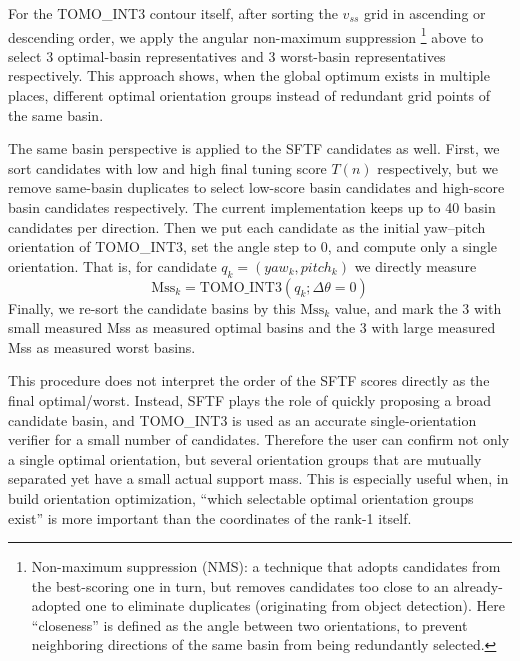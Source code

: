 \documentclass[11pt,a4paper]{article}
\begin{document}
For the TOMO\_INT3 contour itself, after sorting the $v_{ss}$ grid in ascending or descending order,
we apply the angular non-maximum suppression%
\footnote{Non-maximum suppression (NMS): a technique that adopts candidates from the best-scoring one in turn, but removes candidates
too close to an already-adopted one to eliminate duplicates (originating from object detection). Here ``closeness'' is defined as the angle
between two orientations, to prevent neighboring directions of the same basin from being redundantly selected.}
above to select 3 optimal-basin representatives and 3 worst-basin representatives respectively.
This approach shows, when the global optimum exists in multiple places,
different optimal orientation groups instead of redundant grid points of the same basin.

The same basin perspective is applied to the SFTF candidates as well.
First, we sort candidates with low and high final tuning score $T(n)$ respectively, but
we remove same-basin duplicates to select low-score basin candidates and high-score basin candidates respectively.
The current implementation keeps up to 40 basin candidates per direction.
Then we put each candidate as the initial yaw--pitch orientation of TOMO\_INT3,
set the angle step to 0, and compute only a single orientation.
That is, for candidate $q_k=(yaw_k,pitch_k)$ we directly measure
\begin{equation}
\mathrm{Mss}_k
=
\mathrm{TOMO\_INT3}(q_k;\Delta\theta=0)
\end{equation}
Finally, we re-sort the candidate basins by this $\mathrm{Mss}_k$ value,
and mark the 3 with small measured Mss as measured optimal basins
and the 3 with large measured Mss as measured worst basins.

This procedure does not interpret the order of the SFTF scores directly as the final optimal/worst.
Instead, SFTF plays the role of quickly proposing a broad candidate basin,
and TOMO\_INT3 is used as an accurate single-orientation verifier for a small number of candidates.
Therefore the user can confirm not only a single optimal orientation, but
several orientation groups that are mutually separated yet have a small actual support mass.
This is especially useful when, in build orientation optimization, ``which selectable optimal orientation groups exist''
is more important than the coordinates of the rank-1 itself.
\end{document}
